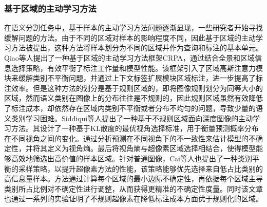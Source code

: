 \subsubsection{基于区域的主动学习方法}
在语义分割任务中，基于样本的主动学习方法问题逐渐显现，一些研究者开始寻找缓解问题的方法。由于不同的区域对样本的影响程度不同，因此基于区域的主动学习方法被提出，这种方法将样本划分为不同的区域并作为查询和标注的基本单元。Qiao等人提出了一种基于区域的主动学习方法框架CRPA，通过结合全景和区域信息选择策略，有效平衡了标注工作量和模型性能。该框架引入了区域高斯注意力模块来缓解类别不平衡问题，并通过上下文标签扩展模块区域标注，进一步提高了标注效率。但是这种方法的划分是基于规则区域的，即将图像规则划分为同等大小的区域，然而语义类别在图像上的分布往往是不规则的，因此规则区域虽然有效降低了标注成本，却依然存在区域内类别不平衡或者分布不均匀的问题，导致少量的语义类别学习困难。Siddiqui等人提出了一种基于不规则区域面向深度图像的主动学习方法。其设计了一种基于KL散度的最优视角选择标准，用于衡量预测概率分布在不同视角之间的变化。通过分析预测在不同视角下的不一致性来估计模型的不确定性，并将其定义为视角熵。最后将视角熵与超像素区域选择相结合，使得模型能够高效地筛选出高价值的样本区域。针对普通图像，Cai等人也提出了一种类别平衡的采样策略，以提升超像素方法的性能，该策略能够优先选择来自低占比类别的高信息量样本。方法通过计算每个区域的最小边际不确定性，再依据每个区域主导类别所占比例对不确定性进行调整，从而获得更精准的不确定性度量。同时该文章也通过一系列的实验证明了不规则超像素在降低标注成本方面优于规则化的区域。
